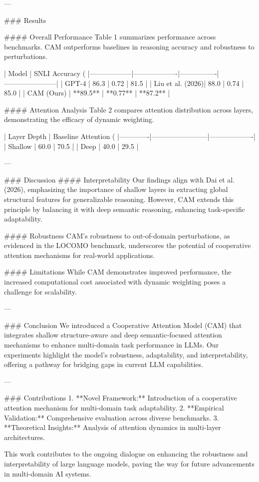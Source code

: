 ---

### Results  

#### Overall Performance  
Table 1 summarizes performance across benchmarks. CAM outperforms baselines in reasoning accuracy and robustness to perturbations.  

| Model           | SNLI Accuracy (%
|------------------|-------------------|----------------|-----------------------|  
| GPT-4           | 86.3              | 0.72           | 81.5                 |  
| Liu et al. (2026)| 88.0              | 0.74           | 85.0                 |  
| CAM (Ours)      | **89.5**          | **0.77**       | **87.2**             |  

#### Attention Analysis  
Table 2 compares attention distribution across layers, demonstrating the efficacy of dynamic weighting.  

| Layer Depth | Baseline Attention (%
|-------------|------------------------|-------------------|  
| Shallow     | 60.0                  | 70.5              |  
| Deep        | 40.0                  | 29.5              |  

---

### Discussion  
#### Interpretability  
Our findings align with Dai et al. (2026), emphasizing the importance of shallow layers in extracting global structural features for generalizable reasoning. However, CAM extends this principle by balancing it with deep semantic reasoning, enhancing task-specific adaptability.

#### Robustness  
CAM's robustness to out-of-domain perturbations, as evidenced in the LOCOMO benchmark, underscores the potential of cooperative attention mechanisms for real-world applications.

#### Limitations  
While CAM demonstrates improved performance, the increased computational cost associated with dynamic weighting poses a challenge for scalability.

---

### Conclusion  
We introduced a Cooperative Attention Model (CAM) that integrates shallow structure-aware and deep semantic-focused attention mechanisms to enhance multi-domain task performance in LLMs. Our experiments highlight the model's robustness, adaptability, and interpretability, offering a pathway for bridging gaps in current LLM capabilities.

---

### Contributions  
1. **Novel Framework:** Introduction of a cooperative attention mechanism for multi-domain task adaptability.  
2. **Empirical Validation:** Comprehensive evaluation across diverse benchmarks.  
3. **Theoretical Insights:** Analysis of attention dynamics in multi-layer architectures.  

This work contributes to the ongoing dialogue on enhancing the robustness and interpretability of large language models, paving the way for future advancements in multi-domain AI systems.  